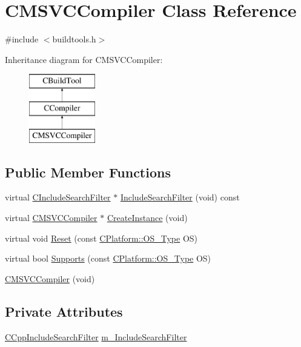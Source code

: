 \hypertarget{classCMSVCCompiler}{\section{C\-M\-S\-V\-C\-Compiler Class Reference}
\label{classCMSVCCompiler}
}


{\ttfamily \#include $<$buildtools.\-h$>$}

Inheritance diagram for C\-M\-S\-V\-C\-Compiler\-:\begin{figure}[H]
\begin{center}
\leavevmode
\includegraphics[height=3.000000cm]{db/de9/classCMSVCCompiler}
\end{center}
\end{figure}
\subsection*{Public Member Functions}
\begin{DoxyCompactItemize}
\item 
virtual \hyperlink{classCIncludeSearchFilter}{C\-Include\-Search\-Filter} $\ast$ \hyperlink{classCMSVCCompiler_a0ae941f148de8e1cbfefa8361034aeec}{Include\-Search\-Filter} (void) const 
\item 
virtual \hyperlink{classCMSVCCompiler}{C\-M\-S\-V\-C\-Compiler} $\ast$ \hyperlink{classCMSVCCompiler_a00dec77c231cace2f66fe45fccb25c7e}{Create\-Instance} (void)
\item 
virtual void \hyperlink{classCMSVCCompiler_add080abc4d9d62ecfb08d0acb32b7693}{Reset} (const \hyperlink{classCPlatform_a2fb735c63c53052f79629e338bb0f535}{C\-Platform\-::\-O\-S\-\_\-\-Type} O\-S)
\item 
virtual bool \hyperlink{classCMSVCCompiler_ac0d2bf0b4569ee2c375d8358ff1fba66}{Supports} (const \hyperlink{classCPlatform_a2fb735c63c53052f79629e338bb0f535}{C\-Platform\-::\-O\-S\-\_\-\-Type} O\-S)
\item 
\hyperlink{classCMSVCCompiler_a0b5c4fcb77e6c7d22dcbf5597799dbb6}{C\-M\-S\-V\-C\-Compiler} (void)
\end{DoxyCompactItemize}
\subsection*{Private Attributes}
\begin{DoxyCompactItemize}
\item 
\hyperlink{classCCppIncludeSearchFilter}{C\-Cpp\-Include\-Search\-Filter} \hyperlink{classCMSVCCompiler_ad92703ebd37a1b940847f18f3d393360}{m\-\_\-\-Include\-Search\-Filter}
\end{DoxyCompactItemize}
